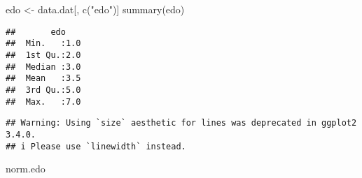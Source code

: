 \documentclass[
]{article}
\newenvironment{Shaded}{\begin{snugshade}}{\end{snugshade}}
\newcommand{\AttributeTok}[1]{\textcolor[rgb]{0.77,0.63,0.00}{#1}}
\newcommand{\ConstantTok}[1]{\textcolor[rgb]{0.00,0.00,0.00}{#1}}
\newcommand{\DecValTok}[1]{\textcolor[rgb]{0.00,0.00,0.81}{#1}}
\newcommand{\FunctionTok}[1]{\textcolor[rgb]{0.00,0.00,0.00}{#1}}
\newcommand{\NormalTok}[1]{#1}
\newcommand{\OtherTok}[1]{\textcolor[rgb]{0.56,0.35,0.01}{#1}}
\newcommand{\SpecialCharTok}[1]{\textcolor[rgb]{0.00,0.00,0.00}{#1}}
\newcommand{\StringTok}[1]{\textcolor[rgb]{0.31,0.60,0.02}{#1}}
\begin{document}
\begin{Shaded}
\begin{Highlighting}[]
\NormalTok{edo }\OtherTok{\textless{}{-}}\NormalTok{ data.dat[, }\FunctionTok{c}\NormalTok{(}\StringTok{"edo"}\NormalTok{)]}
\FunctionTok{summary}\NormalTok{(edo)}
\end{Highlighting}
\end{Shaded}

\begin{verbatim}
##       edo     
##  Min.   :1.0  
##  1st Qu.:2.0  
##  Median :3.0  
##  Mean   :3.5  
##  3rd Qu.:5.0  
##  Max.   :7.0
\end{verbatim}

\begin{Shaded}
\end{Shaded}

\begin{verbatim}
## Warning: Using `size` aesthetic for lines was deprecated in ggplot2 3.4.0.
## i Please use `linewidth` instead.
\end{verbatim}

\begin{Shaded}
\begin{Highlighting}[]
\NormalTok{norm.edo }
\end{Highlighting}
\end{Shaded}
\end{document}
